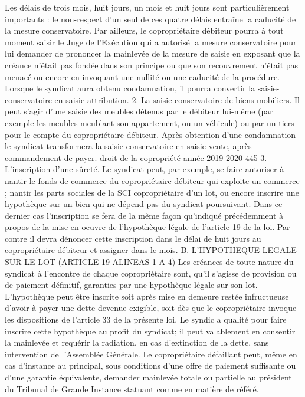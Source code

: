 Les délais de trois mois, huit jours, un mois et huit jours sont particulièrement importants : le non-respect d'un seul de ces quatre délais entraîne la caducité de la mesure conservatoire.
Par ailleurs, le copropriétaire débiteur pourra à tout moment saisir le Juge de l'Exécution qui a autorisé la mesure conservatoire pour lui demander de prononcer la mainlevée de la mesure de saisie en exposant que la créance n'était pas fondée dans son principe ou que son recouvrement n'était pas menacé ou encore en invoquant une nullité ou une caducité de la procédure.
Lorsque le syndicat aura obtenu condamnation, il pourra convertir la saisie-conservatoire en saisie-attribution.
2. La saisie conservatoire de biens mobiliers.
Il peut s'agir d'une saisie des meubles détenus par le débiteur lui-même (par exemple les meubles meublant son appartement, ou un véhicule) ou par un tiers pour le compte du copropriétaire débiteur.
Après obtention d'une condamnation le syndicat transformera la saisie conservatoire en saisie vente, après commandement de payer.
droit de la copropriété année 2019-2020
445
3. L’inscription d'une sûreté.
Le syndicat peut, par exemple, se faire autoriser à nantir le fonds de commerce du copropriétaire débiteur qui exploite un commerce ; nantir les parts sociales de la SCI copropriétaire d'un lot, ou encore inscrire une hypothèque sur un bien qui ne dépend pas du syndicat poursuivant. Dans ce dernier cas l'inscription se fera de la même façon qu'indiqué précédemment à propos de la mise en oeuvre de l'hypothèque légale de l'article 19 de la loi. Par contre il devra dénoncer cette inscription dans le délai de huit jours au copropriétaire débiteur et assigner dans le mois.
B. L’HYPOTHEQUE LEGALE SUR LE LOT (ARTICLE 19 ALINEAS 1 A 4)
Les créances de toute nature du syndicat à l'encontre de chaque copropriétaire sont, qu'il s'agisse de provision ou de paiement définitif, garanties par une hypothèque légale sur son lot. L'hypothèque peut être inscrite soit après mise en demeure restée infructueuse d'avoir à payer une dette devenue exigible, soit dès que le copropriétaire invoque les dispositions de l'article 33 de la présente loi.
Le syndic a qualité pour faire inscrire cette hypothèque au profit du syndicat; il peut valablement en consentir la mainlevée et requérir la radiation, en cas d'extinction de la dette, sans intervention de l'Assemblée Générale.
Le copropriétaire défaillant peut, même en cas d'instance au principal, sous conditions d'une offre de paiement suffisante ou d'une garantie équivalente, demander mainlevée totale ou partielle au président du Tribunal de Grande Instance statuant comme en matière de référé.
